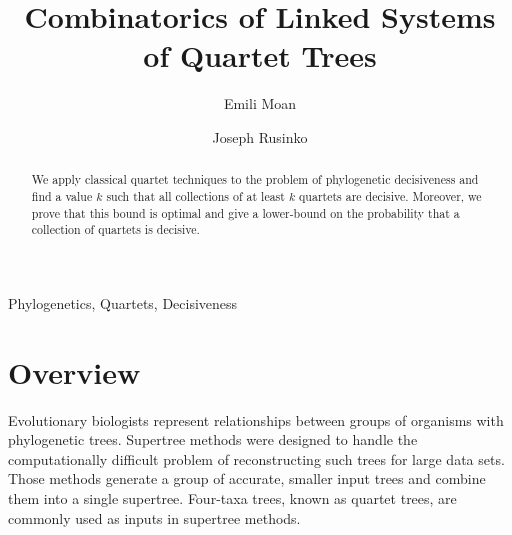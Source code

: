 \documentclass[final,3p,times]{elsarticle}
\theoremstyle{definition}
\theoremstyle{remark}
\begin{document}
\begin{frontmatter}

\title{Combinatorics of Linked Systems of Quartet Trees}


\author[label1]{Emili Moan}
\address[label1]{Dept.\ of Mathematics, Winthrop University, Rock Hill, SC 29733 USA}



\author[label1]{Joseph Rusinko}


\begin{abstract}
We apply classical quartet techniques to the problem of phylogenetic decisiveness and find a value $k$ such that all collections of at least $k$ quartets are decisive. Moreover, we prove that this bound is optimal and give a lower-bound on the probability that a collection of quartets is decisive.
\end{abstract}

\begin{keyword}
Phylogenetics, Quartets, Decisiveness
\end{keyword}

\end{frontmatter}


\section{Overview}
Evolutionary biologists represent relationships between groups of organisms with phylogenetic trees. Supertree methods were designed to handle the computationally difficult problem of reconstructing such trees for large data sets. Those methods generate a group of accurate, smaller input trees and combine them into a single supertree. Four-taxa trees, known as quartet trees, are commonly used as inputs in supertree methods. 
\end{document}
